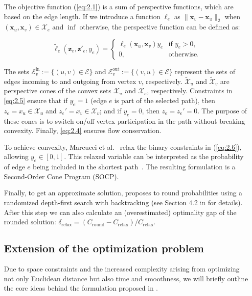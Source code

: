 The objective function (\ref{eq:2.1}) is a sum of perspective functions, which are based on the edge length. If we introduce a function \({\ell_e}\) as \(\| \mathbf{x}_v - \mathbf{x}_u \|_2\) when \((\mathbf{x}_u, \mathbf{x}_v) \in \mathcal{X}_e\) and \(\inf\) otherwise, the perspective function can be defined as:

\[
\tilde{\ell}_e(\mathbf{z}_e, \mathbf{z}'_e, y_e) =
\begin{cases}
\ell_e(\mathbf{x}_u, \mathbf{x}_v) y_e & \text{if } y_e > 0, \\

0, & \text{otherwise}.
\end{cases}
\]

The sets $\mathcal{E}_v^{\mathrm{in}} := \{(u, v) \in \mathcal{E}\}$ and $\mathcal{E}_v^{\mathrm{out}} := \{(v, u) \in \mathcal{E}\}$ represent the sets of edges incoming to and outgoing from vertex $v$, respectively. \(\tilde{\mathcal{X}}_u\) and \(\tilde{\mathcal{X}}_v\) are perspective cones of the convex sets $\mathcal{X}_u$ and $\mathcal{X}_v$, respectively. Constraints in \ref{eq:2.5} ensure that if $y_e = 1$ (edge $e$ is part of the selected path), then $z_e = x_u \in \mathcal{X}_u$ and $z_e' = x_v \in \mathcal{X}_v$; and if $y_e = 0$, then $z_e = z_e' = 0$. The purpose of these cones is to switch on/off vertex participation in the path without breaking convexity. Finally, \ref{eq:2.4} ensures flow conservation.

To achieve convexity, Marcucci et al.~\cite{marcucci2024shortest} relax the binary constraints in (\ref{eq:2.6}), allowing \( y_e \in [0, 1] \). This relaxed variable can be interpreted as the probability of edge \( e \) being included in the shortest path~\cite{marcucci2023motion}. The resulting formulation is a Second-Order Cone Program (SOCP).

Finally, to get an approximate solution, \cite{marcucci2023motion} proposes to round probabilities using a randomized depth-first search with backtracking (see Section 4.2 in \cite{marcucci2023motion} for details). After this step we can also calculate an (overestimated) optimality gap of the rounded solution: \( \delta_{\text{relax}} = (C_\text{round} - C_\text{relax}) / C_{\text{relax}} \).

\subsection{Extension of the optimization problem}
Due to space constraints and the increased complexity arising from optimizing not only Euclidean distance but also time and smoothness, we will briefly outline the core ideas behind the formulation proposed in \cite{marcucci2023motion}.

